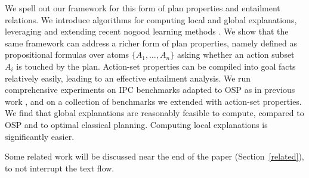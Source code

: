 We spell out our framework for this form of plan properties and
entailment relations. We introduce algorithms for computing local and
global explanations, leveraging and extending recent nogood learning
methods
\cite{steinmetz:hoffmann:ai-17,steinmetz:hoffmann:ijcai-17}. We show
that the same framework can address a richer form of plan properties,
namely  defined as propositional
formulas over atoms $\{A_1, \dots, A_n\}$ asking whether an action
subset $A_i$ is touched by the plan. Action-set properties can be
compiled into goal facts relatively easily, leading to an effective
entailment analysis. We run comprehensive experiments on IPC
benchmarks adapted to OSP as in previous work
\cite{domshlak:mirkis:jair-15,katz:etal:icaps-19}, and on a collection
of benchmarks we extended with action-set properties. We find that
global explanations are reasonably feasible to compute, compared to
OSP and to optimal classical planning. Computing local explanations is
significantly easier.
%
%

Some related work will be discussed near the end of the paper
(Section~\ref{related}), to not interrupt the text flow.




















